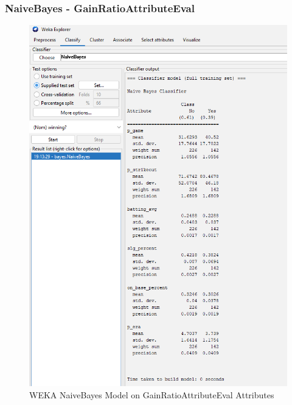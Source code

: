 \documentclass[12pt]{article}
\begin{document}
\newpage
\subsubsection{NaiveBayes - GainRatioAttributeEval}
\begin{figure}[h!]
    \includegraphics[scale=0.4]{./images/GainRatioAttributeEval/NaiveBayes-Model.png}
\centering
    \caption{WEKA NaiveBayes Model on GainRatioAttributeEval Attributes}
\end{figure}
\newpage
\end{document}

